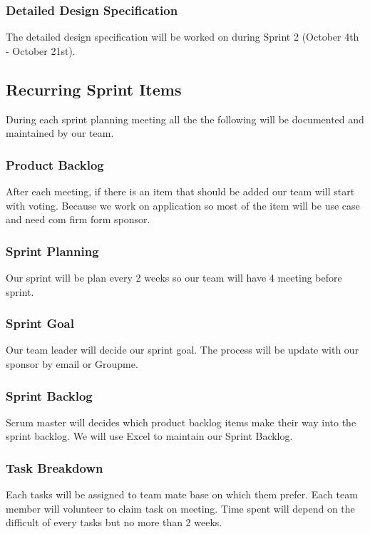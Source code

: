 \subsubsection{Detailed Design Specification}
The detailed design specification will be worked on during Sprint 2 (October 4th - October 21st).

\subsection{Recurring Sprint Items}
During each sprint planning meeting all the the following will be documented and maintained by our team.

\subsubsection{Product Backlog}

After each meeting, if there is an item that should be added our team will start with voting. Because we work on application so most of the item will be use case and need com firm form sponsor.
\subsubsection{Sprint Planning}

Our sprint will be plan every 2 weeks so our team will have 4 meeting before sprint. 

\subsubsection{Sprint Goal}

Our team leader will decide our sprint goal. The process will be update with our sponsor by email or Groupme.
\subsubsection{Sprint Backlog}

Scrum master will decides  which product backlog items make their way into the sprint backlog. We will use Excel to maintain our Sprint Backlog.
\subsubsection{Task Breakdown}

Each tasks will be assigned to team mate base on which them prefer. Each team member will volunteer to claim task on meeting. Time spent will depend on the difficult of every tasks but no more than 2 weeks.

